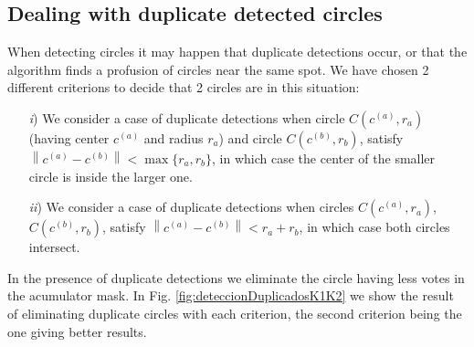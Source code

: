 \documentclass[oribibl]{llncs}
\begin{document}
\subsection{Dealing with duplicate detected circles}
When detecting circles it may happen that duplicate detections occur, or that the algorithm finds a profusion of circles near the same spot. We have chosen 2 different criterions to decide that 2 circles are in this situation:
\begin{itemize}
\item[{\it i})] We consider a case of duplicate detections when circle $C(c^{(a)}, r_a)$ (having center $c^{(a)}$ and radius $r_a$) and circle $C(c^{(b)}, r_b)$, satisfy \mbox{ $ \left\| c^{(a)} - c^{(b)}  \right\| \! < \max\{r_a,r_b\}$}, 
in which case the center of the smaller circle is inside the larger one. \\
\item[{\it ii})] We consider a case of duplicate detections when circles $C(c^{(a)}, r_a)$, $C(c^{(b)}, r_b)$, satisfy   $\left\| c^{(a)} - c^{(b)} \right\| < r_a+r_b$, in which case both circles intersect.
\end{itemize}
%
In the presence of duplicate detections we eliminate the circle having less votes in the acumulator mask. In Fig. \ref{fig:deteccionDuplicadosK1K2} we show the result of eliminating duplicate circles with each criterion, 
the second criterion being the one giving better results.
%
%
\end{document}
